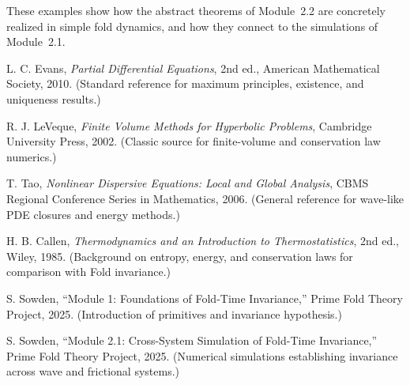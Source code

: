 \documentclass[11pt]{article}
\begin{document}

These examples show how the abstract theorems of Module~2.2 are concretely realized in simple fold dynamics, and how they connect to the simulations of Module~2.1.



\begin{thebibliography}{9}

L. C. Evans, \textit{Partial Differential Equations}, 2nd ed., American Mathematical Society, 2010.  
(Standard reference for maximum principles, existence, and uniqueness results.)

R. J. LeVeque, \textit{Finite Volume Methods for Hyperbolic Problems}, Cambridge University Press, 2002.  
(Classic source for finite-volume and conservation law numerics.)

T. Tao, \textit{Nonlinear Dispersive Equations: Local and Global Analysis}, CBMS Regional Conference Series in Mathematics, 2006.  
(General reference for wave-like PDE closures and energy methods.)

H. B. Callen, \textit{Thermodynamics and an Introduction to Thermostatistics}, 2nd ed., Wiley, 1985.  
(Background on entropy, energy, and conservation laws for comparison with Fold invariance.)

S. Sowden, ``Module 1: Foundations of Fold-Time Invariance,'' Prime Fold Theory Project, 2025.  
(Introduction of primitives and invariance hypothesis.)

S. Sowden, ``Module 2.1: Cross-System Simulation of Fold-Time Invariance,'' Prime Fold Theory Project, 2025.  
(Numerical simulations establishing invariance across wave and frictional systems.)

\end{thebibliography}
\end{document}
